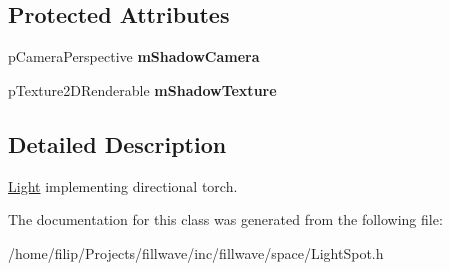 \subsection*{Protected Attributes}
\begin{DoxyCompactItemize}
\item 
\hypertarget{classfillwave_1_1space_1_1LightSpot_ac622f73ab05f58ff9780b1918eb5d2cc}{}p\+Camera\+Perspective {\bfseries m\+Shadow\+Camera}\label{classfillwave_1_1space_1_1LightSpot_ac622f73ab05f58ff9780b1918eb5d2cc}

\item 
\hypertarget{classfillwave_1_1space_1_1LightSpot_ac5c8723664455f70d0afffc4ddcdfba5}{}p\+Texture2\+D\+Renderable {\bfseries m\+Shadow\+Texture}\label{classfillwave_1_1space_1_1LightSpot_ac5c8723664455f70d0afffc4ddcdfba5}

\end{DoxyCompactItemize}


\subsection{Detailed Description}
\hyperlink{classfillwave_1_1space_1_1Light}{Light} implementing directional torch. 

The documentation for this class was generated from the following file\+:\begin{DoxyCompactItemize}
\item 
/home/filip/\+Projects/fillwave/inc/fillwave/space/Light\+Spot.\+h\end{DoxyCompactItemize}
